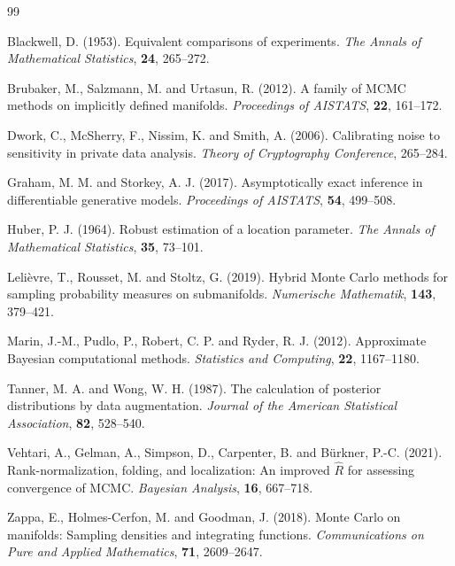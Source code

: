 \documentclass[smallextended,natbib,runningheads]{svjour3}
\begin{document}
\begin{thebibliography}{99}

Blackwell, D. (1953).
Equivalent comparisons of experiments.
\emph{The Annals of Mathematical Statistics}, \textbf{24}, 265--272.

Brubaker, M., Salzmann, M. and Urtasun, R. (2012).
A family of MCMC methods on implicitly defined manifolds.
\emph{Proceedings of AISTATS}, \textbf{22}, 161--172.

Dwork, C., McSherry, F., Nissim, K. and Smith, A. (2006).
Calibrating noise to sensitivity in private data analysis.
\emph{Theory of Cryptography Conference}, 265--284.

Graham, M. M. and Storkey, A. J. (2017).
Asymptotically exact inference in differentiable generative models.
\emph{Proceedings of AISTATS}, \textbf{54}, 499--508.

Huber, P. J. (1964).
Robust estimation of a location parameter.
\emph{The Annals of Mathematical Statistics}, \textbf{35}, 73--101.

Leli\`evre, T., Rousset, M. and Stoltz, G. (2019).
Hybrid Monte Carlo methods for sampling probability measures on submanifolds.
\emph{Numerische Mathematik}, \textbf{143}, 379--421.

Marin, J.-M., Pudlo, P., Robert, C. P. and Ryder, R. J. (2012).
Approximate Bayesian computational methods.
\emph{Statistics and Computing}, \textbf{22}, 1167--1180.

Tanner, M. A. and Wong, W. H. (1987).
The calculation of posterior distributions by data augmentation.
\emph{Journal of the American Statistical Association}, \textbf{82}, 528--540.

Vehtari, A., Gelman, A., Simpson, D., Carpenter, B. and B\"urkner, P.-C. (2021).
Rank-normalization, folding, and localization: An improved $\widehat R$ for
assessing convergence of MCMC.
\emph{Bayesian Analysis}, \textbf{16}, 667--718.

Zappa, E., Holmes-Cerfon, M. and Goodman, J. (2018).
Monte Carlo on manifolds: Sampling densities and integrating functions.
\emph{Communications on Pure and Applied Mathematics}, \textbf{71}, 2609--2647.

\end{thebibliography}
\end{document}
